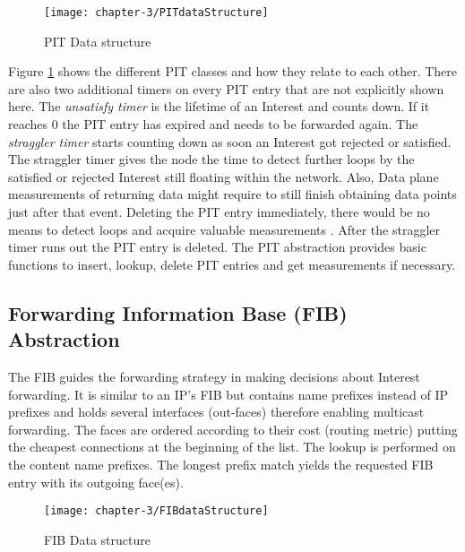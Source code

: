 \vspace{5mm} %

\begin{figure}[H]
  \centering
  \texttt{[image: chapter-3/PITdataStructure]}
  \caption{PIT Data structure \cite{Afanasyev16}}
  \label{fig:PITdataStructure}
\end{figure}

\vspace{5mm} %

Figure \ref{fig:PITdataStructure} shows the different PIT classes and how they relate to each other. There are also two additional timers on every PIT entry that are not explicitly shown here. The \emph{unsatisfy timer} is the lifetime of an Interest and counts down. If it reaches 0 the PIT entry has expired and needs to be forwarded again. The \emph{straggler timer} starts counting down as soon an Interest got rejected or satisfied. The straggler timer gives the node the time to detect further loops by the satisfied or rejected Interest still floating within the network. Also, Data plane measurements of returning data might require to still finish obtaining data points just after that event. Deleting the PIT entry immediately, there would be no means to detect loops and acquire valuable measurements \cite{Afanasyev16}. After the straggler timer runs out the PIT entry is deleted. The PIT abstraction provides basic functions to insert, lookup, delete PIT entries and get measurements if necessary.

\subsection{Forwarding Information Base (FIB) Abstraction}

The FIB guides the forwarding strategy in making decisions about Interest forwarding. It is similar to an IP's FIB but contains name prefixes instead of IP prefixes and holds several interfaces (out-faces) therefore enabling multicast forwarding. The faces are ordered according to their cost (routing metric) putting the cheapest connections at the beginning of the list. The lookup is performed on the content name prefixes. The longest prefix match yields the requested FIB entry with its outgoing face(es).

\vspace{5mm} %

\begin{figure}[H]
  \centering
  \texttt{[image: chapter-3/FIBdataStructure]}
  \caption{FIB Data structure \cite{Afanasyev16}}
  \label{fig:FIBdataStructure}
\end{figure}

